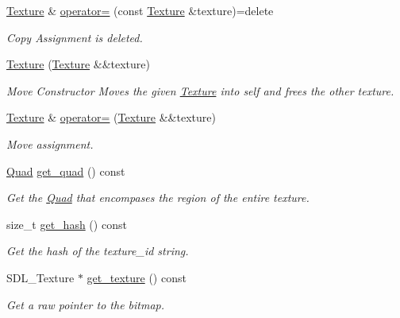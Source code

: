 \begin{DoxyCompactItemize}
\mbox{\label{classinferno_1_1graphics_1_1_texture_a43833ad31daec597f4b10bd95b4f9e24}} 
\mbox{\hyperlink{classinferno_1_1graphics_1_1_texture}{Texture}} \& \mbox{\hyperlink{classinferno_1_1graphics_1_1_texture_a43833ad31daec597f4b10bd95b4f9e24}{operator=}} (const \mbox{\hyperlink{classinferno_1_1graphics_1_1_texture}{Texture}} \&texture)=delete
\begin{DoxyCompactList}\small\item\em Copy Assignment is deleted. \end{DoxyCompactList}\item 
\mbox{\hyperlink{classinferno_1_1graphics_1_1_texture_ad7eaa953877ac0b52e215db9840deb53}{Texture}} (\mbox{\hyperlink{classinferno_1_1graphics_1_1_texture}{Texture}} \&\&texture)
\begin{DoxyCompactList}\small\item\em Move Constructor Moves the given \mbox{\hyperlink{classinferno_1_1graphics_1_1_texture}{Texture}} into self and frees the other texture. \end{DoxyCompactList}\item 
\mbox{\hyperlink{classinferno_1_1graphics_1_1_texture}{Texture}} \& \mbox{\hyperlink{classinferno_1_1graphics_1_1_texture_a5409fce4e118c09b6caa012ced780a59}{operator=}} (\mbox{\hyperlink{classinferno_1_1graphics_1_1_texture}{Texture}} \&\&texture)
\begin{DoxyCompactList}\small\item\em Move assignment. \end{DoxyCompactList}\item 
\mbox{\hyperlink{classinferno_1_1graphics_1_1_quad}{Quad}} \mbox{\hyperlink{classinferno_1_1graphics_1_1_texture_a710559d0540e821183c7c1b4c6b2cd92}{get\+\_\+quad}} () const
\begin{DoxyCompactList}\small\item\em Get the \mbox{\hyperlink{classinferno_1_1graphics_1_1_quad}{Quad}} that encompases the region of the entire texture. \end{DoxyCompactList}\item 
size\+\_\+t \mbox{\hyperlink{classinferno_1_1graphics_1_1_texture_a372544d61705f814fd1cdd399fe28175}{get\+\_\+hash}} () const
\begin{DoxyCompactList}\small\item\em Get the hash of the texture\+\_\+id string. \end{DoxyCompactList}\item 
S\+D\+L\+\_\+\+Texture $\ast$ \mbox{\hyperlink{classinferno_1_1graphics_1_1_texture_ab6961dc8a3c043744b518c73edae0890}{get\+\_\+texture}} () const
\begin{DoxyCompactList}\small\item\em Get a raw pointer to the bitmap. \end{DoxyCompactList}\end{DoxyCompactItemize}


